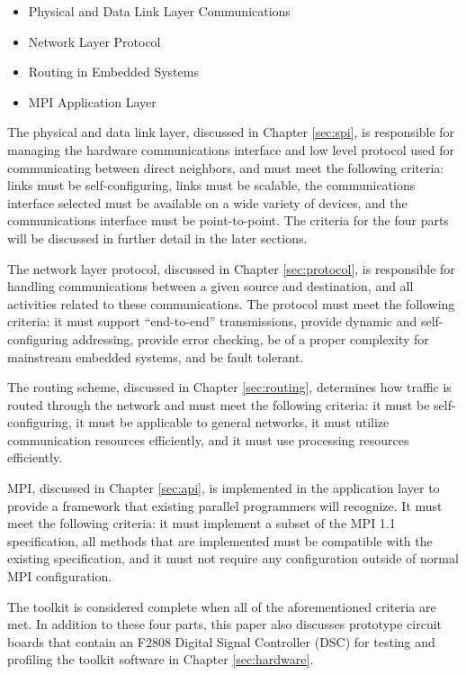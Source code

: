 \begin{itemize}
	\item Physical and Data Link Layer Communications
	\item Network Layer Protocol
	\item Routing in Embedded Systems
	\item MPI Application Layer
\end{itemize}

The physical and data link layer, discussed in Chapter \ref{sec:spi}, is responsible for managing the hardware communications interface and low level protocol used for communicating between direct neighbors, and must meet the following criteria: links must be self-configuring, links must be scalable, the communications interface selected must be available on a wide variety of devices, and the communications interface must be point-to-point. The criteria for the four parts will be discussed in further detail in the later sections.

The network layer protocol, discussed in Chapter \ref{sec:protocol}, is responsible for handling communications between a given source and destination, and all activities related to these communications. The protocol must meet the following criteria: it must support ``end-to-end'' transmissions, provide dynamic and self-configuring addressing, provide error checking, be of a proper complexity for mainstream embedded systems, and be fault tolerant.

The routing scheme, discussed in Chapter \ref{sec:routing}, determines how traffic is routed through the network and must meet the following criteria: it must be self-configuring, it must be applicable to general networks, it must utilize communication resources efficiently, and it must use processing resources efficiently.

MPI, discussed in Chapter \ref{sec:api}, is implemented in the application layer to provide a framework that existing parallel programmers will recognize. It must meet the following criteria: it must implement a subset of the MPI 1.1 specification, all methods that are implemented must be compatible with the existing specification, and it must not require any configuration outside of normal MPI configuration.

The toolkit is considered complete when all of the aforementioned criteria are met. In addition to these four parts, this paper also discusses prototype circuit boards that contain an F2808 Digital Signal Controller (DSC) for testing and profiling the toolkit software in Chapter \ref{sec:hardware}.